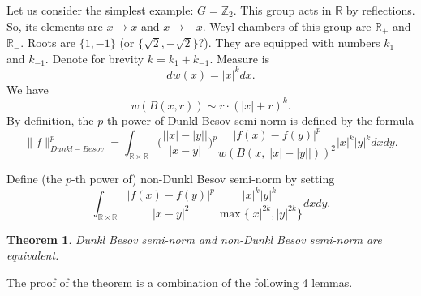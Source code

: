 \documentclass{amsart}
\newtheorem{thm}{Theorem}
\begin{document}
Let us consider the simplest example: $G=\mathbb{Z}_2.$ This group acts in $\mathbb{R}$ by reflections. So, its elements are $x\to x$ and $x\to -x.$ Weyl chambers of this group are $\mathbb{R}_+$ and $\mathbb{R}_-.$ Roots are $\{1,-1\}$ (or $\{\sqrt{2},-\sqrt{2}\}$?). They are equipped with numbers $k_1$ and $k_{-1}.$ Denote for brevity $k=k_1+k_{-1}.$ Measure is
$$dw(x)=|x|^kdx.$$
We have
$$w(B(x,r))\sim r\cdot (|x|+r)^k.$$
By definition, the $p$-th power of Dunkl Besov semi-norm is defined by the formula
$$\|f\|_{Dunkl-Besov}^p=\int_{\mathbb{R}\times\mathbb{R}}\Big(\frac{\big||x|-|y|\big|}{|x-y|}\Big)^p\frac{|f(x)-f(y)|^p}{w(B(x,\big||x|-|y|\big|))^2}|x|^k|y|^kdxdy.$$


Define (the $p$-th power of) non-Dunkl Besov semi-norm by setting
$$\int_{\mathbb{R}\times\mathbb{R}}\frac{|f(x)-f(y)|^p}{|x-y|^2}\frac{|x|^k|y|^k}{\max\{|x|^{2k},|y|^{2k}\}}dxdy.$$

\begin{thm} Dunkl Besov semi-norm and non-Dunkl Besov semi-norm are equivalent.
\end{thm}

The proof of the theorem is a combination of the following 4 lemmas.
\end{document}
